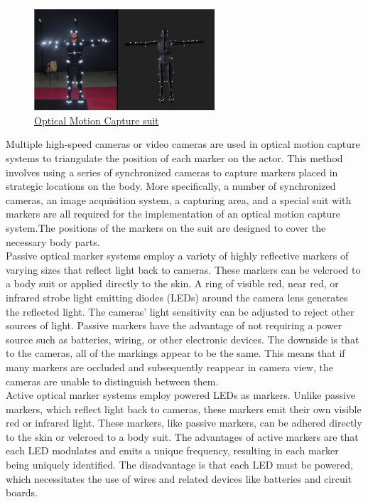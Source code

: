 
\begin{figure}[h]
	\centering
	\includegraphics[width=0.6\textwidth]{figures/background/Optical.png}
	\caption{\href{https://www.researchgate.net/profile/Jacek-Hordyj/publication/283152771/figure/fig1/AS:669997391159296@1536751234023/Actor-wearing-suit-adjusted-for-optical-motion-capture-on-the-left-Virtual-model.png}
	{Optical Motion Capture suit}}
\end{figure}

Multiple high-speed cameras   \cite{Optical Motion Capture: Theory and Implementation,MOTION CAPTURE TO BUILD A FOUNDATION FOR A COMPUTER-CONTROLLED INSTRUMENT BY STUDY OF CLASSICAL GUITAR PERFORMANCE} or video cameras are used in optical motion capture systems to triangulate the position of each marker on the actor. This method involves using a series of synchronized cameras to capture markers placed in strategic locations on the body. More specifically, a number of synchronized cameras, an image acquisition system, a capturing area, and a special suit with markers are all required for the implementation of an optical motion capture system.The positions of the markers on the suit are designed to cover the necessary body parts.\\

Passive optical marker systems employ a variety of highly reflective markers of varying sizes that reflect light back to cameras. These markers can be velcroed to a body suit or applied directly to the skin. A ring of visible red, near red, or infrared strobe light emitting diodes (LEDs) around the camera lens generates the reflected light. The cameras' light sensitivity can be adjusted to reject other sources of light. Passive markers have the advantage of not requiring a power source such as batteries, wiring, or other electronic devices. The downside is that to the cameras, all of the markings appear to be the same. This means that if many markers are occluded and subsequently reappear in camera view, the cameras are unable to distinguish between them.\\

Active optical marker systems employ powered LEDs as markers.
Unlike passive markers, which reflect light back to cameras, these markers emit their own visible red or infrared light. These markers, like passive markers, can be adhered directly to the skin or velcroed to a body suit. The advantages of active markers are that each LED modulates and emits a unique frequency, resulting in each marker being uniquely identified. The disadvantage is that each LED must be powered, which necessitates the use of wires and related devices like batteries and circuit boards.
